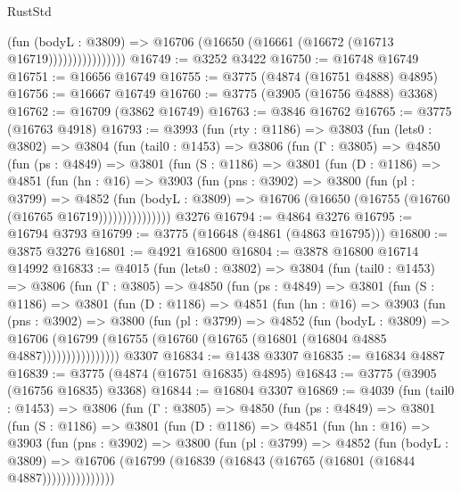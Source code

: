 \begin{lexlean}{RustStd}
\begin{coremodule}
{\begin{coremodule}
{{{{{{{{{{{{{{{{{{{{{{{{{{{{{{{                          (fun (bodyL : @3809) =>
                          @16706 (@16650 (@16661 (@16672 (@16713 @16719))))))))))))))))
@16749 := @3252 @3422
@16750 := @16748 @16749
@16751 := @16656 @16749
@16755 := @3775 (@4874 (@16751 @4888) @4895)
@16756 := @16667 @16749
@16760 := @3775 (@3905 (@16756 @4888) @3368)
@16762 := @16709 (@3862 @16749)
@16763 := @3846 @16762
@16765 := @3775 (@16763 @4918)
@16793 := @3993
    (fun (rty : @1186) =>
    @3803
      (fun (lets0 : @3802) =>
      @3804
        (fun (tail0 : @1453) =>
        @3806
          (fun (Γ : @3805) =>
          @4850
            (fun (ps : @4849) =>
            @3801
              (fun (S : @1186) =>
              @3801
                (fun (D : @1186) =>
                @4851
                  (fun (hn : @16) =>
                  @3903
                    (fun (pns : @3902) =>
                    @3800
                      (fun (pl : @3799) =>
                      @4852
                        (fun (bodyL : @3809) =>
                        @16706 (@16650 (@16755 (@16760 (@16765 @16719)))))))))))))))
    @3276
@16794 := @4864 @3276
@16795 := @16794 @3793
@16799 := @3775 (@16648 (@4861 (@4863 @16795)))
@16800 := @3875 @3276
@16801 := @4921 @16800
@16804 := @3878 @16800 @16714 @14992
@16833 := @4015
    (fun (lets0 : @3802) =>
    @3804
      (fun (tail0 : @1453) =>
      @3806
        (fun (Γ : @3805) =>
        @4850
          (fun (ps : @4849) =>
          @3801
            (fun (S : @1186) =>
            @3801
              (fun (D : @1186) =>
              @4851
                (fun (hn : @16) =>
                @3903
                  (fun (pns : @3902) =>
                  @3800
                    (fun (pl : @3799) =>
                    @4852
                      (fun (bodyL : @3809) =>
                      @16706
                        (@16799 (@16755 (@16760 (@16765 (@16801 (@16804 @4885 @4887))))))))))))))))
    @3307
@16834 := @1438 @3307
@16835 := @16834 @4887
@16839 := @3775 (@4874 (@16751 @16835) @4895)
@16843 := @3775 (@3905 (@16756 @16835) @3368)
@16844 := @16804 @3307
@16869 := @4039
    (fun (tail0 : @1453) =>
    @3806
      (fun (Γ : @3805) =>
      @4850
        (fun (ps : @4849) =>
        @3801
          (fun (S : @1186) =>
          @3801
            (fun (D : @1186) =>
            @4851
              (fun (hn : @16) =>
              @3903
                (fun (pns : @3902) =>
                @3800
                  (fun (pl : @3799) =>
                  @4852
                    (fun (bodyL : @3809) =>
                    @16706 (@16799 (@16839 (@16843 (@16765 (@16801 (@16844 @4887)))))))))))))))
}}}}}}}}}}}}}}}}}}}}}}}}}}}}}}}
\end{coremodule}}
\end{coremodule}
\end{lexlean}
